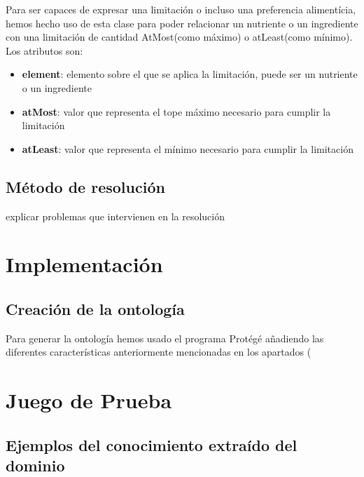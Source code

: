 \documentclass[12]{article}
\begin{document}
Para ser capaces de expresar una limitación o incluso una preferencia alimentícia, hemos hecho uso de esta clase para poder relacionar un nutriente o un ingrediente con una limitación de cantidad AtMost(como máximo) o atLeast(como mínimo).
\\

Los atributos son:
\begin{itemize}
\item \textbf{element}: elemento sobre el que se aplica la limitación, puede ser un nutriente o un ingrediente
\item \textbf{atMost}: valor que representa el tope máximo necesario para cumplir la limitación
\item \textbf{atLeast}: valor que representa el mínimo necesario para cumplir la limitación
\end{itemize}




\subsection{Método de resolución}

 explicar problemas que intervienen en la resolución

\section{Implementación}

\subsection{Creación de la ontología}

Para generar la ontología hemos usado el programa Protégé añadiendo las diferentes características anteriormente mencionadas en los apartados (


\section{Juego de Prueba}



\subsection{Ejemplos del conocimiento extraído del dominio}
\end{document}
